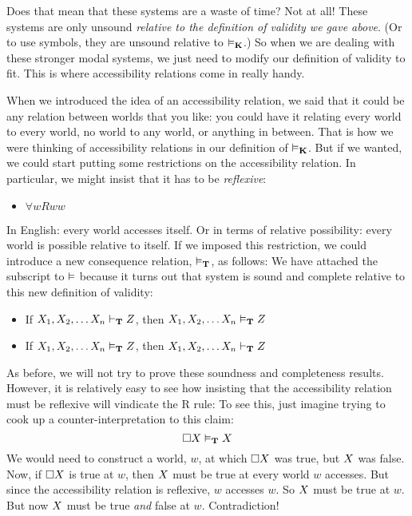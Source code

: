 Does that mean that these systems are a waste of time? Not at all! These systems are only unsound \emph{relative to the definition of validity we gave above}. (Or to use symbols, they are unsound relative to $\vDash_{\mathbf{K}}$.) So when we are dealing with these stronger modal systems, we just need to modify our definition of validity to fit. This is where accessibility relations come in really handy.

When we introduced the idea of an accessibility relation, we said that it could be any relation between worlds that you like: you could have it relating every world to every world, no world to any world, or anything in between. That is how we were thinking of accessibility relations in our definition of $\vDash_{\mathbf{K}}$. But if we wanted, we could start putting some restrictions on the accessibility relation. In particular, we might insist that it has to be \emph{reflexive}:
\begin{itemize}
	\item $\forall wRww$
\end{itemize}
In English: every world accesses itself. Or in terms of relative possibility: every world is possible relative to itself. If we imposed this restriction, we could introduce a new consequence relation, $\vDash_{\mathbf{T}}$, as follows:
We have attached the \mlT{} subscript to $\vDash$ because it turns out that system \mlT{} is sound and complete relative to this new definition of validity:
\begin{itemize}
	\item If $X_1,X_2, \dots X_n\vdash_{\mathbf{T}}Z$, then $X_1,X_2, \dots X_n\vDash_{\mathbf{T}}Z$
	\item If $X_1,X_2, \dots X_n\vDash_{\mathbf{T}}Z$, then $X_1,X_2, \dots X_n\vdash_{\mathbf{T}}Z$
\end{itemize}
As before, we will not try to prove these soundness and completeness results. However, it is relatively easy to see how insisting that the accessibility relation must be reflexive will vindicate the R\mlT{} rule:
To see this, just imagine trying to cook up a counter-interpretation to this claim:
\[
	\Box X\vDash_{\mathbf{T}} X
\]
We would need to construct a world, $w$, at which $\Box X$ was true, but $X$ was false. Now, if $\Box X$ is true at $w$, then $X$ must be true at every world $w$ accesses. But since the accessibility relation is reflexive, $w$ accesses $w$. So $X$ must be true at $w$. But now $X$ must be true \emph{and} false at $w$. Contradiction!

